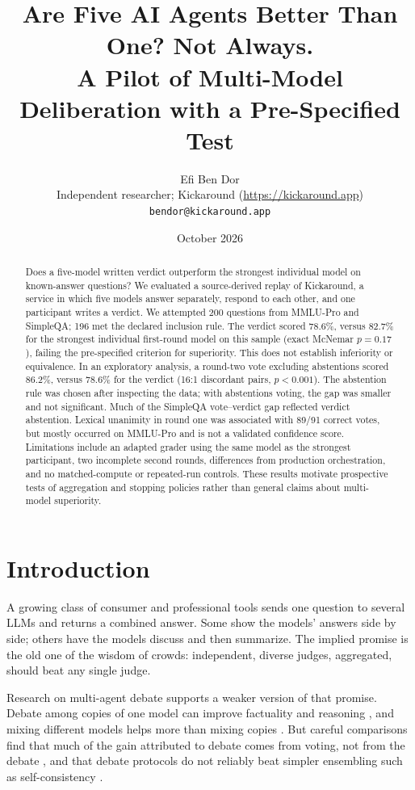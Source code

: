 \documentclass[11pt]{article}
\title{Are Five AI Agents Better Than One? Not Always.\\[4pt]
\large A Pilot of Multi-Model Deliberation with a Pre-Specified Test}
\author{Efi Ben Dor\\
Independent researcher; Kickaround (\url{https://kickaround.app})\\
\texttt{bendor@kickaround.app}}
\date{October 2026}
\begin{document}
\maketitle

\begin{abstract}
Does a five-model written verdict outperform the strongest individual model on known-answer questions? We evaluated a source-derived replay of Kickaround, a service in which five models answer separately, respond to each other, and one participant writes a verdict. We attempted 200 questions from MMLU-Pro and SimpleQA; 196 met the declared inclusion rule. The verdict scored 78.6\%, versus 82.7\% for the strongest individual first-round model on this sample (exact McNemar $p=0.17$), failing the pre-specified criterion for superiority. This does not establish inferiority or equivalence. In an exploratory analysis, a round-two vote excluding abstentions scored 86.2\%, versus 78.6\% for the verdict (16:1 discordant pairs, $p<0.001$). The abstention rule was chosen after inspecting the data; with abstentions voting, the gap was smaller and not significant. Much of the SimpleQA vote--verdict gap reflected verdict abstention. Lexical unanimity in round one was associated with 89/91 correct votes, but mostly occurred on MMLU-Pro and is not a validated confidence score. Limitations include an adapted grader using the same model as the strongest participant, two incomplete second rounds, differences from production orchestration, and no matched-compute or repeated-run controls. These results motivate prospective tests of aggregation and stopping policies rather than general claims about multi-model superiority.
\end{abstract}

\section{Introduction}

A growing class of consumer and professional tools sends one question to several LLMs and returns a combined answer. Some show the models' answers side by side; others have the models discuss and then summarize. The implied promise is the old one of the wisdom of crowds: independent, diverse judges, aggregated, should beat any single judge.

Research on multi-agent debate supports a weaker version of that promise. Debate among copies of one model can improve factuality and reasoning \citep{du2023}, and mixing different models helps more than mixing copies \citep{chen2024reconcile}. But careful comparisons find that much of the gain attributed to debate comes from voting, not from the debate \citep{choi2025}, and that debate protocols do not reliably beat simpler ensembling such as self-consistency \citep{smit2024,wang2023sc}.
\end{document}
